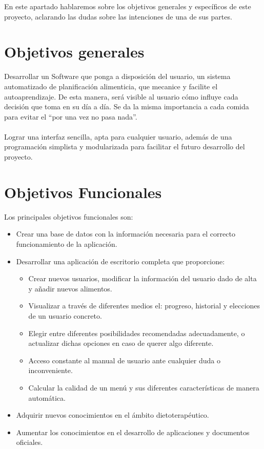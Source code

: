 
En este apartado hablaremos sobre los objetivos generales y específicos de este proyecto, aclarando las dudas sobre las intenciones de una de sus partes.
\section{Objetivos generales}
Desarrollar un Software que ponga a disposición del usuario, un sistema automatizado de planificación alimenticia, que mecanice y facilite el autoaprendizaje. De esta manera, será visible al usuario cómo influye cada decisión que toma en su día a día. Se da la misma importancia a cada comida para evitar el “por una vez no pasa nada”. \\
\\
Lograr una interfaz sencilla, apta para cualquier usuario, además de una programación simplista y modularizada para facilitar el futuro desarrollo del proyecto.
\\
\section{Objetivos Funcionales }
Los principales objetivos funcionales son:
\begin{itemize}
\item Crear una base de datos con la información necesaria para el correcto funcionamiento de la aplicación.
\item Desarrollar una aplicación de escritorio completa que proporcione:
\begin{itemize}
\item Crear nuevos usuarios, modificar la información del usuario dado de alta y añadir nuevos alimentos.
\item Visualizar a través de diferentes medios el:  progreso, historial y elecciones de un usuario concreto.
\item Elegir entre diferentes posibilidades recomendadas adecuadamente, o actualizar dichas opciones en caso de querer algo diferente.
\item Acceso constante al manual de usuario ante cualquier duda o inconveniente.
\item Calcular la calidad de un menú y sus diferentes características de manera automática.
\end{itemize}
\item Adquirir nuevos conocimientos en el ámbito dietoterapéutico.
\item Aumentar los conocimientos en el desarrollo de aplicaciones y documentos oficiales.
\end{itemize}
